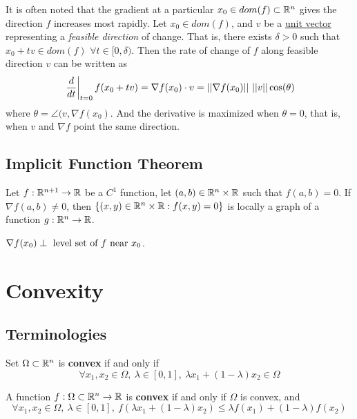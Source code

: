 \documentclass{article}
\begin{document}
    It is often noted that the gradient at a particular $x_0 \in dom(f) \subset \mathbb{R}^n$ gives the direction $f$ increases most rapidly.
        Let $x_0 \in dom(f)$, and $v$ be a \ul{unit vector} representing a \emph{feasible direction} of change. That is, there exists $\delta > 0$ such that $x_0 + t v \in dom(f)$ $\forall t \in [0, \delta)$. Then the rate of change of $f$ along feasible direction $v$ can be written as
        \begin{equation}
            \left.\frac{d}{dt}\right\vert_{t=0} f(x_0 + tv) = \nabla f(x_0) \cdot v = \vert \vert {\nabla f(x_0)} \vert \vert\ \vert \vert {v} \vert \vert \cos(\theta)
        \end{equation}
        where $\theta = \angle (v, \nabla f(x_0)$. And the derivative is maximized when $\theta=0$, that is, when $v$ and $\nabla f$ point the same direction.
    
    \subsection{Implicit Function Theorem}
    \begin{theorem}
        Let $f: \mathbb{R}^{n+1} \to \mathbb{R}$ be a $C^1$ function, let $(a, b) \in \mathbb{R}^n \times \mathbb{R}$ such that $f(a, b) = 0$. If $\nabla f(a, b) \neq 0$, then $\{(x, y) \in \mathbb{R}^n \times \mathbb{R}:f(x, y) = 0\}$ is locally a graph of a function $g: \mathbb{R}^n \to \mathbb{R}$.
    \end{theorem}
    
    \begin{remark}
        $\nabla f(x_0) \perp \text{{ level set of $f$ near $x_0$}}$.
    \end{remark}
    
    \section{Convexity}
    \subsection{Terminologies}
    \begin{definition}
        Set $\Omega \subset \mathbb{R}^n$ is \textbf{convex} if and only if 
        \begin{equation}
            \forall x_1, x_2 \in \Omega,\ \lambda \in [0, 1],\ \lambda x_1 + (1 - \lambda) x_2 \in \Omega
        \end{equation}
    \end{definition}
    
    \begin{definition}
        A function $f: \Omega \subset \mathbb{R}^n \to \mathbb{R}$ is \textbf{convex} if and only if $\Omega$ is convex, and 
        \begin{equation}
            \forall x_1, x_2 \in \Omega,\ \lambda \in [0, 1],\ f\left(\lambda x_1 + (1- \lambda) x_2 \right) \leq \lambda f(x_1) + (1 - \lambda) f(x_2)
        \end{equation}
    \end{definition}
    
\end{document}

